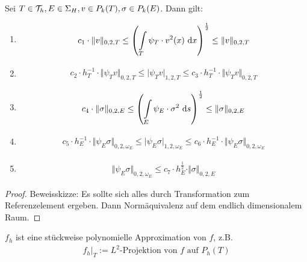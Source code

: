 \begin{theorem}
	Sei $T\in\mathcal{T}_h,E\in\Sigma_H, v\in P_k(T), \sigma\in P_k(E)$. Dann gilt:
	\begin{enumerate}[label=(\arabic*)]
		\item 
		\begin{align*}
			c_1\cdot\Vert v\Vert_{0,2,T}
			\leq\left(\int\limits_T\psi_T\cdot v^2(x)\text{ d} x\right)^{\frac{1}{2}} \leq\Vert v\Vert_{0,2,T}
		\end{align*}
		\item
		\begin{align*}
			c_2\cdot h_T^{-1}\cdot\big\Vert\psi_T v\big\Vert_{0,2,T}\leq\big|\psi_T v\big|_{1,2,T}\leq c_3\cdot h_T^{-1}\cdot\big\Vert\psi_T v\big\Vert_{0,2,T}
		\end{align*}
		\item
		\begin{align*}
			c_4\cdot\Vert\sigma\Vert_{0,2,E} \leq\left(\int\limits_E\psi_E\cdot\sigma^2\text{ d} s\right)^{\frac{1}{2}}\leq \Vert\sigma\Vert_{0,2,E}
		\end{align*}
		\item
		\begin{align*}
			c_5\cdot h_E^{-1}\cdot\big\Vert\psi_E\sigma\big\Vert_{0,2,\omega_E}
			\leq\big|\psi_E\sigma\big|_{1,2,\omega_E}
			\leq c_6\cdot h_E^{-1}\cdot\big\Vert\psi_E\sigma\big\Vert_{0,2,\omega_E}
		\end{align*}
		\item 
		\begin{align*}
			\big\Vert\psi_E\sigma\big\Vert_{0,2,\omega_E}
			\leq c_7\cdot h_E^{\frac{1}{2}}\cdot\Vert\sigma\Vert_{0,2,E}
		\end{align*}
	\end{enumerate}
\end{theorem}
\begin{proof}
	Beweisskizze: Es sollte sich alles durch Transformation zum Referenzelement ergeben. Dann Normäquivalenz auf dem endlich dimensionalem Raum.
\end{proof}

$f_h$ ist eine stückweise  polynomielle Approximation von $f$, z.B.
\begin{align*}
	f_h\big|_T:=L^2\text{-Projektion von $f$ auf }P_h(T)
\end{align*}

